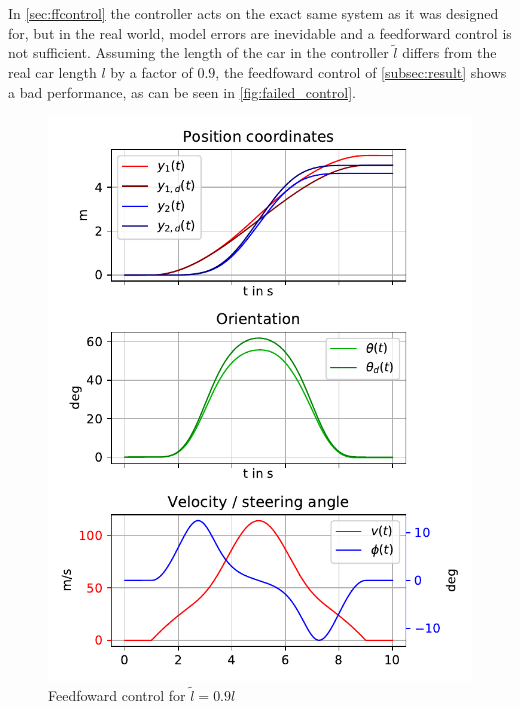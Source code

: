 \documentclass[a4paper,11pt,headings=standardclasses,parskip=half]{scrartcl}
\begin{document}
In \autoref{sec:ffcontrol} the controller acts on the exact same system as it was designed for, but in the real world, model errors are inevidable and a feedforward control is not sufficient. Assuming the length of the car in the controller $\tilde{l}$ differs from the real car length $l$ by a factor of $0.9$, the feedfoward control of \ref{subsec:result} shows a bad performance, as can be seen in \autoref{fig:failed_control}. 
\begin{figure}[ht]
\centering
\includegraphics[scale=1]{img/failedcontrol.pdf}
\caption{Feedfoward control for $\tilde{l}=0.9l$}
\label{fig:failed_control}
\end{figure}
\end{document}
